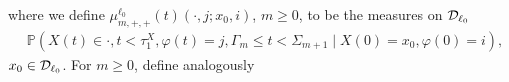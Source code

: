 where we define \(\mu_{m,+,+}^{\ell_0}(t)(\cdot,j;x_0,i) \), \(m\geq 0\), to be the measures on \(\mathcal{D}_{\ell_0}\)
\begin{align}
	&\mathbb P(X(t)\in\cdot, t<\tau_1^X, \varphi(t) = j, \Gamma_m\leq t<\Sigma_{m+1}\mid X(0) = x_0, \varphi(0) = i), \label{eqn: loop mu}
\end{align}
\(x_0\in\mathcal{D}_{\ell_0}\). 
For \(m\geq 0\), define analogously
